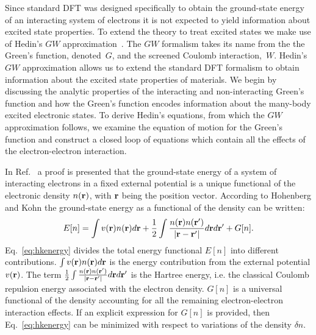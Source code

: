 Since standard DFT was designed specifically to obtain the ground-state energy
of an interacting system of electrons it is not expected to yield information
about excited state properties. To extend the theory to treat excited states
we make use of Hedin's $GW$ approximation~\cite{hedin65}. The $GW$ formalism
takes its name from the the Green's function, denoted~$G$, and the 
screened Coulomb interaction,~$W$. Hedin's $GW$ 
approximation allows us to extend the standard DFT formalism
to obtain information about the excited state properties of materials.
We begin by discussing the analytic properties of the interacting and
non-interacting Green's function and how the Green's function encodes information about
the many-body excited electronic states. To derive Hedin's equations, from which
the $GW$ approximation follows, we examine the equation of motion for the Green's function and
construct a closed loop of equations which contain all the effects of the
electron-electron interaction. 

\noindent
\label{sec:hohnkohn}
In Ref.~\cite{hohenbergkohn64} a proof is presented that the ground-state
energy of a system of interacting electrons
in a fixed external potential is a unique functional of the electronic density $n({\bf r})$,
with ${\bf r}$ being the position vector.
According to Hohenberg and Kohn the ground-state energy as a 
functional of the density can be written:
%
\begin{equation}
\label{eq:hkenergy}
E[n] = \int v({\bf r}) n({\bf r})d{\bf r} + \frac{1}{2}\int \frac{n({\bf r})n({\bf r}')}{|{\bf r}-{\bf r}'|}d{\bf r} d{\bf r}' + G[n].
\end{equation}
%
Eq.~\ref{eq:hkenergy} divides the total energy functional $E[n]$ into different contributions.
$\int v({\bf r})n({\bf r})d{\bf r}$ is the energy contribution from the external potential $v({\bf r})$.
The term $\frac{1}{2}\int\frac{n({\bf r})n({\bf r}')}{|{\bf r}-{\bf r}'|}d{\bf r} d{\bf r}'$ is the Hartree energy,
i.e. the classical Coulomb repulsion energy associated with the
electron density. $G[n]$ is a universal functional of the 
density accounting for all the remaining electron-electron 
interaction effects.
%
If an explicit expression for $G[n]$ is provided, then 
Eq.~\ref{eq:hkenergy} can be minimized with respect 
to variations of the density $\delta n$.

